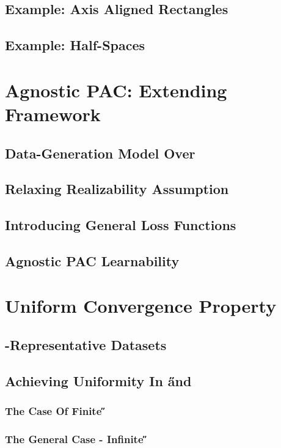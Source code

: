 \documentclass[11pt,fleqn]{book} %
\begin{document}
        \subsection{Example: Axis Aligned Rectangles}
        \subsection{Example: Half-Spaces}
        
    \section{Agnostic PAC: Extending Framework}
        \subsection{Data-Generation Model Over \X\times\Y}
        \subsection{Relaxing Realizability Assumption}
        \subsection{Introducing General Loss Functions}
        \subsection{Agnostic PAC Learnability}
    
    \section{Uniform Convergence Property}
        \subsection{\e-Representative Datasets}
        \subsection{Achieving Uniformity In \H and \D}
            \subsubsection{The Case Of Finite \H}
            \subsubsection{The General Case - Infinite \H}
    
\end{document}
